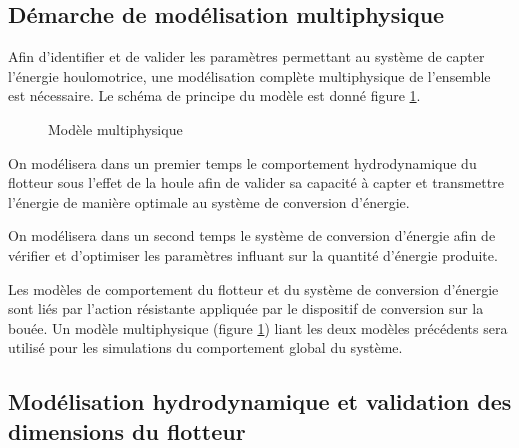 \subsection{Démarche de modélisation multiphysique}

Afin d'identifier et de valider les paramètres permettant au système de capter l'énergie houlomotrice, une modélisation complète multiphysique de l'ensemble est nécessaire. Le schéma de principe du modèle est donné figure \ref{fig08}.

\begin{figure}[ht!]
\begin{center}
  \def\svgwidth{0.95\linewidth}
  
 \end{center}
  \caption{Modèle multiphysique}
\label{fig08}
\end{figure}

On modélisera dans un premier temps le comportement hydrodynamique du flotteur sous l'effet de la houle afin de valider sa capacité à capter et transmettre l'énergie de manière optimale au système de conversion d'énergie.

On modélisera dans un second temps le système de conversion d'énergie afin de vérifier et d'optimiser les paramètres influant sur la quantité d'énergie produite.

Les modèles de comportement du flotteur et du système de conversion d'énergie sont liés par l'action résistante appliquée par le dispositif de conversion sur la bouée. Un modèle multiphysique (figure \ref{fig08}) liant les deux modèles précédents sera utilisé pour les simulations du comportement global du système.

\subsection{Modélisation hydrodynamique et validation des dimensions du flotteur}

